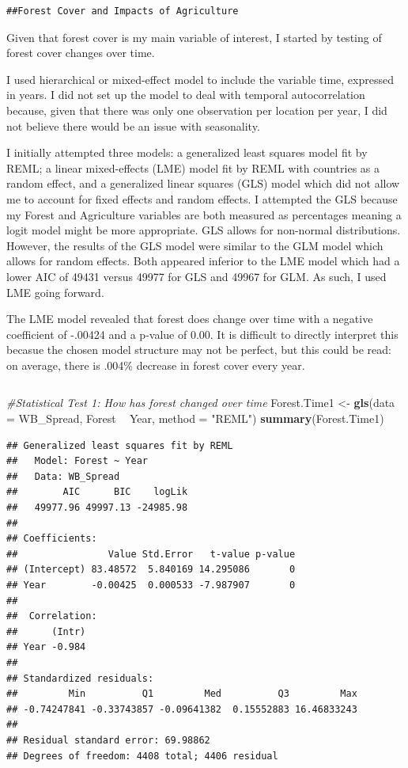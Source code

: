 \documentclass[12pt,]{article}
\newenvironment{Shaded}{\begin{snugshade}}{\end{snugshade}}
\newcommand{\KeywordTok}[1]{\textcolor[rgb]{0.13,0.29,0.53}{\textbf{#1}}}
\newcommand{\DataTypeTok}[1]{\textcolor[rgb]{0.13,0.29,0.53}{#1}}
\newcommand{\StringTok}[1]{\textcolor[rgb]{0.31,0.60,0.02}{#1}}
\newcommand{\CommentTok}[1]{\textcolor[rgb]{0.56,0.35,0.01}{\textit{#1}}}
\newcommand{\OperatorTok}[1]{\textcolor[rgb]{0.81,0.36,0.00}{\textbf{#1}}}
\newcommand{\NormalTok}[1]{#1}
\begin{document}
\begin{verbatim}
##Forest Cover and Impacts of Agriculture
\end{verbatim}

Given that forest cover is my main variable of interest, I started by
testing of forest cover changes over time.

I used hierarchical or mixed-effect model to include the variable time,
expressed in years. I did not set up the model to deal with temporal
autocorrelation because, given that there was only one observation per
location per year, I did not believe there would be an issue with
seasonality.

I initially attempted three models: a generalized least squares model
fit by REML; a linear mixed-effects (LME) model fit by REML with
countries as a random effect, and a generalized linear squares (GLS)
model which did not allow me to account for fixed effects and random
effects. I attempted the GLS because my Forest and Agriculture variables
are both measured as percentages meaning a logit model might be more
appropriate. GLS allows for non-normal distributions. However, the
results of the GLS model were similar to the GLM model which allows for
random effects. Both appeared inferior to the LME model which had a
lower AIC of 49431 versus 49977 for GLS and 49967 for GLM. As such, I
used LME going forward.

The LME model revealed that forest does change over time with a negative
coefficient of -.00424 and a p-value of 0.00. It is difficult to
directly interpret this becasue the chosen model structure may not be
perfect, but this could be read: on average, there is .004\% decrease in
forest cover every year.

\begin{verbatim}
\end{verbatim}

\begin{Shaded}
\begin{Highlighting}[]
\CommentTok{#Statistical Test 1: How has forest changed over time }
\NormalTok{Forest.Time1 <-}\StringTok{ }\KeywordTok{gls}\NormalTok{(}\DataTypeTok{data =}\NormalTok{ WB_Spread, }
\NormalTok{                    Forest }\OperatorTok{~}\StringTok{ }\NormalTok{Year,}
                    \DataTypeTok{method =} \StringTok{"REML"}\NormalTok{)}
\KeywordTok{summary}\NormalTok{(Forest.Time1)}
\end{Highlighting}
\end{Shaded}

\begin{verbatim}
## Generalized least squares fit by REML
##   Model: Forest ~ Year 
##   Data: WB_Spread 
##        AIC      BIC    logLik
##   49977.96 49997.13 -24985.98
## 
## Coefficients:
##                Value Std.Error   t-value p-value
## (Intercept) 83.48572  5.840169 14.295086       0
## Year        -0.00425  0.000533 -7.987907       0
## 
##  Correlation: 
##      (Intr)
## Year -0.984
## 
## Standardized residuals:
##         Min          Q1         Med          Q3         Max 
## -0.74247841 -0.33743857 -0.09641382  0.15552883 16.46833243 
## 
## Residual standard error: 69.98862 
## Degrees of freedom: 4408 total; 4406 residual
\end{verbatim}
\end{document}
